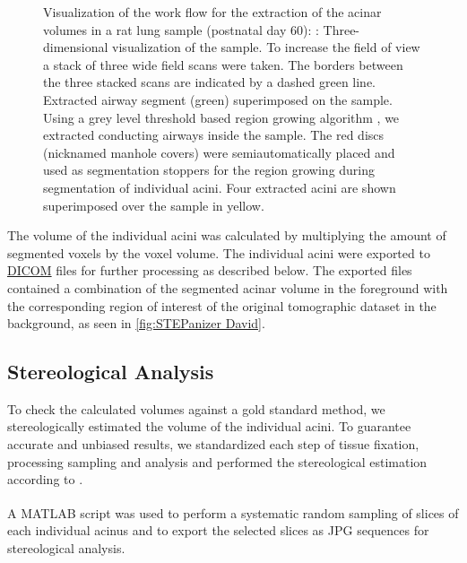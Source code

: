 \documentclass[a4paper,DIV=calc,abstract,english]{scrartcl}
\newlength\imagescale		%
\begin{document}
\begin{figure}
{\begin{tikzpicture}[x=\imagescale,y=-\imagescale]
		\end{tikzpicture}%
		\label{subfig:extracted acini}%
		}%
	\caption{%
		Visualization of the work flow for the extraction of the acinar volumes in a rat lung sample (postnatal day 60): %
		\protect{}: Three-dimensional visualization of the sample.
		To increase the field of view a stack of three wide field scans were taken.
		The borders between the three stacked scans are indicated by a dashed green line. 
		\protect{} Extracted airway segment (green) superimposed on the sample.
		Using a grey level threshold based region growing algorithm , we extracted conducting airways inside the sample.
		The red discs (nicknamed manhole covers) were semiautomatically placed and used as segmentation stoppers for the region growing during segmentation of individual acini.
		\protect{} Four extracted acini are shown superimposed over the sample in yellow.
	}
	\label{fig:workflow}
\end{figure}

The volume of the individual acini was calculated by multiplying the amount of segmented voxels by the voxel volume.
The individual acini were exported to \href{https://secure.wikimedia.org/wikipedia/en/w/index.php?title=Digital_Imaging_and_Communications_in_Medicine&oldid=415023605}{DICOM} files for further processing as described below.
The exported files contained a combination of the segmented acinar volume in the foreground with the corresponding region of interest of the original tomographic dataset in the background, as seen in \autoref{fig:STEPanizer David}.

\subsection{Stereological Analysis}
To check the calculated volumes against a gold standard method, we stereologically estimated the volume of the individual acini.
To guarantee accurate and unbiased results, we standardized each step of tissue fixation, processing sampling and analysis and performed the stereological estimation according to \citet{Hsia2010}.

A MATLAB\textsuperscript{\textregistered} script was used to perform a systematic random sampling of slices of each individual acinus and to export the selected slices as JPG sequences for stereological analysis.
\end{document}
